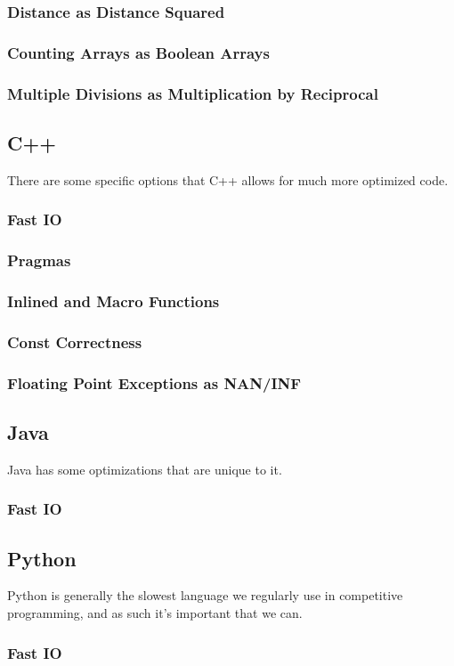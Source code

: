 \subsubsection{Distance as Distance Squared}

\subsubsection{Counting Arrays as Boolean Arrays}

\subsubsection{Multiple Divisions as Multiplication by Reciprocal}

\subsection{C++}

There are some specific options that C++ allows for much more optimized code.

\subsubsection{Fast IO}

\subsubsection{Pragmas}

\subsubsection{Inlined and Macro Functions}

\subsubsection{Const Correctness}

\subsubsection{Floating Point Exceptions as NAN/INF}

\subsection{Java}

Java has some optimizations that are unique to it.

\subsubsection{Fast IO}

\subsection{Python}

Python is generally the slowest language we regularly use in competitive programming, and as such it's important that we can. 

\subsubsection{Fast IO}
